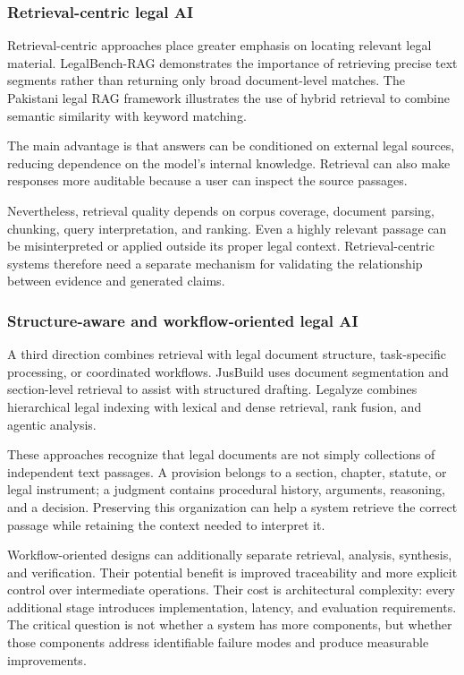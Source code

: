 \subsubsection{Retrieval-centric legal AI}

Retrieval-centric approaches place greater emphasis on locating relevant legal material. LegalBench-RAG
demonstrates the importance of retrieving precise text segments rather than returning only broad
document-level matches. The Pakistani legal RAG framework illustrates the use of hybrid retrieval to
combine semantic similarity with keyword matching.

The main advantage is that answers can be conditioned on external legal sources, reducing dependence on
the model's internal knowledge. Retrieval can also make responses more auditable because a user can
inspect the source passages.

Nevertheless, retrieval quality depends on corpus coverage, document parsing, chunking, query
interpretation, and ranking. Even a highly relevant passage can be misinterpreted or applied outside its
proper legal context. Retrieval-centric systems therefore need a separate mechanism for validating the
relationship between evidence and generated claims.

\subsubsection{Structure-aware and workflow-oriented legal AI}

A third direction combines retrieval with legal document structure, task-specific processing, or
coordinated workflows. JusBuild uses document segmentation and section-level retrieval to assist with
structured drafting. Legalyze combines hierarchical legal indexing with lexical and dense retrieval,
rank fusion, and agentic analysis.

These approaches recognize that legal documents are not simply collections of independent text passages.
A provision belongs to a section, chapter, statute, or legal instrument; a judgment contains procedural
history, arguments, reasoning, and a decision. Preserving this organization can help a system retrieve
the correct passage while retaining the context needed to interpret it.

Workflow-oriented designs can additionally separate retrieval, analysis, synthesis, and verification.
Their potential benefit is improved traceability and more explicit control over intermediate operations.
Their cost is architectural complexity: every additional stage introduces implementation, latency, and
evaluation requirements. The critical question is not whether a system has more components, but whether
those components address identifiable failure modes and produce measurable improvements.


